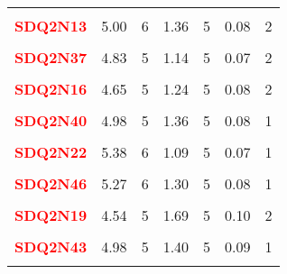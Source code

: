 \documentclass[
]{article}
\begin{document}
\begin{longtable}[t]{>{\raggedright\arraybackslash}p{3cm}rrrrrr}
\endfoot
\bottomrule
\endlastfoot
\textcolor{red}{\textbf{\cellcolor{gray!6}{SDQ2N01}}} & \cellcolor{gray!6}{4.41} & \cellcolor{gray!6}{5} & \cellcolor{gray!6}{1.35} & \cellcolor{gray!6}{5} & \cellcolor{gray!6}{0.08} & \cellcolor{gray!6}{1}\\
\textcolor{red}{\textbf{SDQ2N13}} & 5.00 & 6 & 1.36 & 5 & 0.08 & 2\\
\textcolor{red}{\textbf{\cellcolor{gray!6}{SDQ2N25}}} & \cellcolor{gray!6}{5.10} & \cellcolor{gray!6}{6} & \cellcolor{gray!6}{1.23} & \cellcolor{gray!6}{5} & \cellcolor{gray!6}{0.08} & \cellcolor{gray!6}{1}\\
\textcolor{red}{\textbf{SDQ2N37}} & 4.83 & 5 & 1.14 & 5 & 0.07 & 2\\
\textcolor{red}{\textbf{\cellcolor{gray!6}{SDQ2N04}}} & \cellcolor{gray!6}{4.52} & \cellcolor{gray!6}{5} & \cellcolor{gray!6}{1.40} & \cellcolor{gray!6}{5} & \cellcolor{gray!6}{0.09} & \cellcolor{gray!6}{2}\\
\textcolor{red}{\textbf{SDQ2N16}} & 4.65 & 5 & 1.24 & 5 & 0.08 & 2\\
\textcolor{red}{\textbf{\cellcolor{gray!6}{SDQ2N28}}} & \cellcolor{gray!6}{4.69} & \cellcolor{gray!6}{5} & \cellcolor{gray!6}{1.33} & \cellcolor{gray!6}{5} & \cellcolor{gray!6}{0.08} & \cellcolor{gray!6}{2}\\
\textcolor{red}{\textbf{SDQ2N40}} & 4.98 & 5 & 1.36 & 5 & 0.08 & 1\\
\textcolor{red}{\textbf{\cellcolor{gray!6}{SDQ2N10}}} & \cellcolor{gray!6}{4.62} & \cellcolor{gray!6}{5} & \cellcolor{gray!6}{1.15} & \cellcolor{gray!6}{5} & \cellcolor{gray!6}{0.07} & \cellcolor{gray!6}{1}\\
\textcolor{red}{\textbf{SDQ2N22}} & 5.38 & 6 & 1.09 & 5 & 0.07 & 1\\
\textcolor{red}{\textbf{\cellcolor{gray!6}{SDQ2N34}}} & \cellcolor{gray!6}{3.89} & \cellcolor{gray!6}{4} & \cellcolor{gray!6}{1.70} & \cellcolor{gray!6}{5} & \cellcolor{gray!6}{0.10} & \cellcolor{gray!6}{3}\\
\textcolor{red}{\textbf{SDQ2N46}} & 5.27 & 6 & 1.30 & 5 & 0.08 & 1\\
\textcolor{red}{\textbf{\cellcolor{gray!6}{SDQ2N07}}} & \cellcolor{gray!6}{4.32} & \cellcolor{gray!6}{5} & \cellcolor{gray!6}{1.78} & \cellcolor{gray!6}{5} & \cellcolor{gray!6}{0.11} & \cellcolor{gray!6}{3}\\
\textcolor{red}{\textbf{SDQ2N19}} & 4.54 & 5 & 1.69 & 5 & 0.10 & 2\\
\textcolor{red}{\textbf{\cellcolor{gray!6}{SDQ2N31}}} & \cellcolor{gray!6}{4.74} & \cellcolor{gray!6}{5} & \cellcolor{gray!6}{1.57} & \cellcolor{gray!6}{5} & \cellcolor{gray!6}{0.10} & \cellcolor{gray!6}{2}\\
\textcolor{red}{\textbf{SDQ2N43}} & 4.98 & 5 & 1.40 & 5 & 0.09 & 1\\*
\end{longtable}
\end{document}
